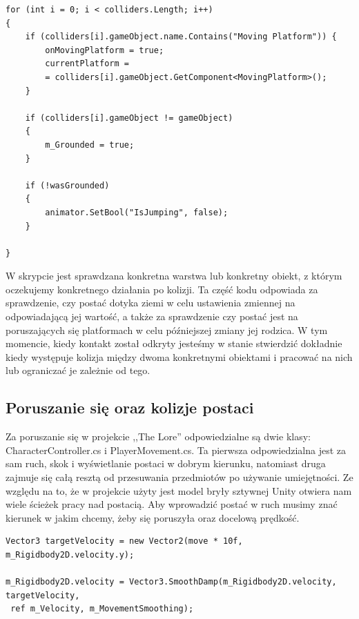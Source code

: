 \documentclass[oneside,polski,logo]{amuthesis}
\begin{document}
\begin{lstlisting}[breaklines=true,
language={[Sharp]C},
rulecolor=\color{blue!80!black},
caption={Fragment klasy \texttt{CharacterController.cs}}
]
for (int i = 0; i < colliders.Length; i++)
{
	if (colliders[i].gameObject.name.Contains("Moving Platform")) {
		onMovingPlatform = true;
		currentPlatform = 
		= colliders[i].gameObject.GetComponent<MovingPlatform>();
	}

	if (colliders[i].gameObject != gameObject)
	{
		m_Grounded = true;
	}

	if (!wasGrounded)
	{
		animator.SetBool("IsJumping", false);
	}

}
\end{lstlisting}

W skrypcie jest sprawdzana konkretna warstwa lub konkretny obiekt, z którym oczekujemy konkretnego działania po kolizji.
Ta część kodu odpowiada za sprawdzenie, czy postać dotyka ziemi w celu ustawienia zmiennej na odpowiadającą jej wartość, a także za sprawdzenie czy postać jest na poruszających się platformach w celu późniejszej zmiany jej rodzica.
W tym momencie, kiedy kontakt został odkryty jesteśmy w stanie stwierdzić dokładnie kiedy występuje kolizja między dwoma konkretnymi obiektami i pracować na nich lub ograniczać je zależnie od tego.
\subsection{Poruszanie się oraz kolizje postaci}
Za poruszanie się w projekcie ,,The Lore'' odpowiedzialne są dwie klasy: CharacterController.cs i PlayerMovement.cs. Ta pierwsza odpowiedzialna jest za sam ruch, skok i wyświetlanie postaci w dobrym kierunku, natomiast druga zajmuje się całą resztą od przesuwania przedmiotów po używanie umiejętności. Ze względu na to, że w projekcie użyty jest model bryły sztywnej Unity otwiera nam wiele ścieżek pracy nad postacią. Aby wprowadzić postać w ruch musimy znać kierunek w jakim chcemy, żeby się poruszyła oraz docelową prędkość.

\begin{lstlisting}[breaklines=true,
language={[Sharp]C},
rulecolor=\color{blue!80!black},
caption={Fragment klasy \texttt{CharacterController.cs}}
]
Vector3 targetVelocity = new Vector2(move * 10f, m_Rigidbody2D.velocity.y);

m_Rigidbody2D.velocity = Vector3.SmoothDamp(m_Rigidbody2D.velocity, targetVelocity,
 ref m_Velocity, m_MovementSmoothing);
\end{lstlisting}
\end{document}
